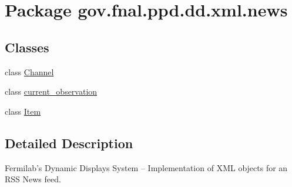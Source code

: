\hypertarget{namespacegov_1_1fnal_1_1ppd_1_1dd_1_1xml_1_1news}{\section{Package gov.\-fnal.\-ppd.\-dd.\-xml.\-news}
\label{namespacegov_1_1fnal_1_1ppd_1_1dd_1_1xml_1_1news}
}
\subsection*{Classes}
\begin{DoxyCompactItemize}
\item 
class \hyperlink{classgov_1_1fnal_1_1ppd_1_1dd_1_1xml_1_1news_1_1Channel}{Channel}
\item 
class \hyperlink{classgov_1_1fnal_1_1ppd_1_1dd_1_1xml_1_1news_1_1current__observation}{current\-\_\-observation}
\item 
class \hyperlink{classgov_1_1fnal_1_1ppd_1_1dd_1_1xml_1_1news_1_1Item}{Item}
\end{DoxyCompactItemize}


\subsection{Detailed Description}
Fermilab's Dynamic Displays System -- Implementation of X\-M\-L objects for an R\-S\-S News feed.